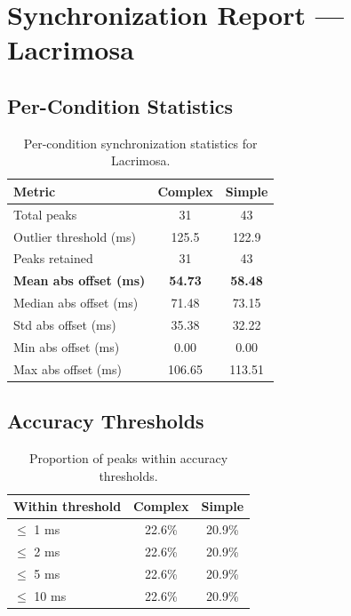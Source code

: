 
\section*{Synchronization Report --- Lacrimosa}

\subsection*{Per-Condition Statistics}

\begin{table}[h!]
\centering
\begin{tabular}{|l|c|c|}
\hline
Metric & Complex & Simple \\
\hline
Total peaks & 31 & 43 \\
Outlier threshold (ms) & 125.5 & 122.9 \\
Peaks retained & 31 & 43 \\
\textbf{Mean abs offset (ms)} & \textbf{54.73} & \textbf{58.48} \\
Median abs offset (ms) & 71.48 & 73.15 \\
Std abs offset (ms) & 35.38 & 32.22 \\
Min abs offset (ms) & 0.00 & 0.00 \\
Max abs offset (ms) & 106.65 & 113.51 \\
\hline
\end{tabular}
\caption{Per-condition synchronization statistics for Lacrimosa.}
\label{tab:sync_stats}
\end{table}

\subsection*{Accuracy Thresholds}

\begin{table}[h!]
\centering
\begin{tabular}{|l|c|c|}
\hline
Within threshold & Complex & Simple \\
\hline
$\leq$ 1 ms & 22.6\% & 20.9\% \\
$\leq$ 2 ms & 22.6\% & 20.9\% \\
$\leq$ 5 ms & 22.6\% & 20.9\% \\
$\leq$ 10 ms & 22.6\% & 20.9\% \\
\hline
\end{tabular}
\caption{Proportion of peaks within accuracy thresholds.}
\label{tab:sync_accuracy}
\end{table}

